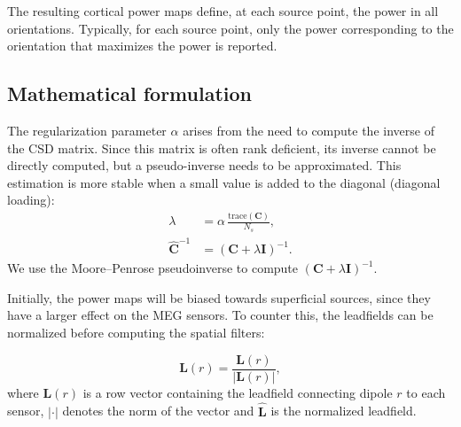 \documentclass[utf8]{frontiersSCNS}
\newcommand{\bm}[1]{\mathbf{#1}}
\newcommand{\mat}[1]{\bm{#1}}
\renewcommand{\vec}[1]{\bm{#1}}
\newcommand{\ctrans}{^{\intercal*}}
\begin{document}
The resulting cortical power maps define, at each source point, the power in all orientations.
Typically, for each source point, only the power corresponding to the orientation that maximizes the power is reported.

\subsection{Mathematical formulation}

The regularization parameter $\alpha$ arises from the need to compute the inverse of the CSD matrix.
Since this matrix is often rank deficient, its inverse cannot be directly computed, but a pseudo-inverse needs to be approximated.
This estimation is more stable when a small value is added to the diagonal (diagonal loading):
\begin{align}\label{eq:inverse}
    \lambda &= \alpha \, \frac{\text{trace}(\mat{C})}{N_s}, \\
    \widehat{\mat{C}}^{-1} &= {(\mat{C} + \lambda \mat{I})}^{-1}.
\end{align}
We use the Moore--Penrose pseudoinverse to compute ${(\mat{C} + \lambda \mat{I})}^{-1}$.

Initially, the power maps will be biased towards superficial sources, since they have a larger effect on the MEG sensors.
To counter this, the leadfields can be normalized before computing the spatial filters:

\begin{equation}\label{eq:leadfield}
    \widehat{\vec{L}}(r) = \frac{\vec{L}(r)}{|\vec{L}(r)|},
\end{equation}
where $\vec{L}(r)$ is a row vector containing the leadfield connecting dipole $r$ to each sensor, $|\cdot|$ denotes the norm of the vector and $\widehat{\vec{L}}$ is the normalized leadfield.

\newcommand{\filter}[2]{
    \mat{A}(#1) \, \mat{C} \, \mat{A}{(#2)}\ctrans
}
\end{document}

